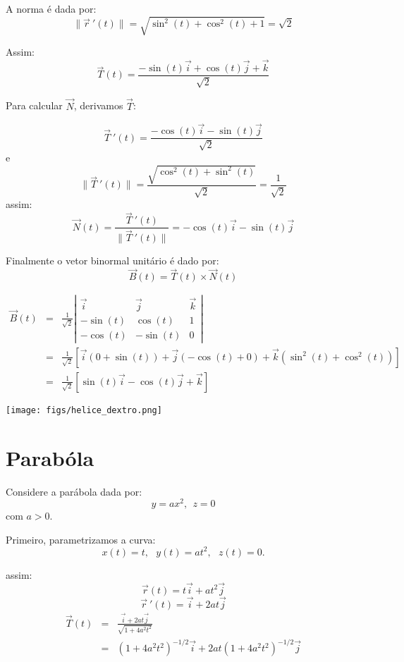 \documentclass[a4paper,10pt]{book}
\begin{document}
A norma é dada por:
$$\|\vec{r}\!~'(t)\|=\sqrt{\sin^2(t)+\cos^2(t)+1}=\sqrt{2}$$

Assim:
$$\vec{T}(t)=\frac{-\sin(t)\vec{i}+\cos(t)\vec{j}+ \vec{k}}{\sqrt{2}}$$

Para calcular $\vec{N}$, derivamos $\vec{T}$:

$$\vec{T}~\!'(t)=\frac{-\cos(t)\vec{i}-\sin(t)\vec{j}}{\sqrt{2}}$$
e
$$\|\vec{T}~\!'(t)\|=\frac{\sqrt{\cos^2(t)+\sin^2(t)}}{\sqrt{2}}=\frac{1}{\sqrt{2}}$$
assim:
$$\vec{N}(t) = \frac{\vec{T}~\!'(t)}{\|\vec{T}~\!'(t)\|}=-\cos(t)\vec{i}-\sin(t)\vec{j}$$


Finalmente o vetor binormal unitário é dado por:
$$\vec{B}(t)= \vec{T}(t)\times \vec{N}(t)$$

\begin{eqnarray*}
 \vec{B}(t)&=&\frac{1}{\sqrt{2}}\left|
 \begin{array}{ccc}
\vec{i}&  \vec{j}&\vec{k}\\
-\sin(t)&\cos(t)&1\\
-\cos(t)&-\sin(t)&0
 \end{array}
 \right|\\
 &=&\frac{1}{\sqrt{2}}\left[\vec{i}\left(0+\sin(t)\right)+\vec{j}\left(-\cos(t)+0\right)+\vec{k}\left(\sin^2(t)+\cos^2(t)\right)\right]\\
 &=&\frac{1}{\sqrt{2}}\left[\sin(t)\vec{i}-\cos(t)\vec{j}+\vec{k}\right]
\end{eqnarray*}



\begin{center}
 \texttt{[image: figs/helice\_dextro.png]}
 \end{center}

 \section{Parabóla}
 
 Considere a parábola dada por:
 $$y = ax^2, ~~z=0$$
 com $a>0$.

 Primeiro, parametrizamos a curva:
 $$x(t)=t,~~~ y(t)=at^2,~~~ z(t)=0.$$
 
 assim:
 $$\vec{r}(t)=t\vec{i}+at^2\vec{j}$$
 $$\vec{r}~\!'(t)=\vec{i}+2at\vec{j}$$
\begin{eqnarray*}
\vec{T}(t)&=&\frac{\vec{i}+2at\vec{j}}{\sqrt{1+4a^2t^2}} \\
&=&\left(1+4a^2t^2\right)^{-1/2}\vec{i}+2at\left(1+4a^2t^2\right)^{-1/2}\vec{j}
\end{eqnarray*}
\end{document}
